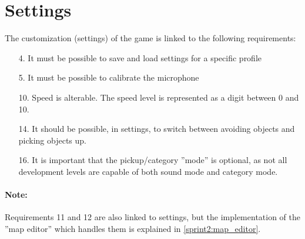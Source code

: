 \section{Settings}

The customization (settings) of the game is linked to the following requirements:

\begin{itemize}
\item[4.] It must be possible to save and load settings for a specific profile
\item[5.] It must be possible to calibrate the microphone
\item[10.] Speed is alterable. The speed level is represented as a digit between 0 and 10.
\item[14.] It should be possible, in settings, to switch between avoiding objects and picking objects up.
\item[16.] It is important that the pickup/category ''mode'' is optional, as not all development levels are capable of both sound mode and category mode.
\end{itemize}

\paragraph{Note:} Requirements 11 and 12 are also linked to settings, but the implementation of the ''map editor'' which handles them is explained in \cref{sprint2:map_editor}.

